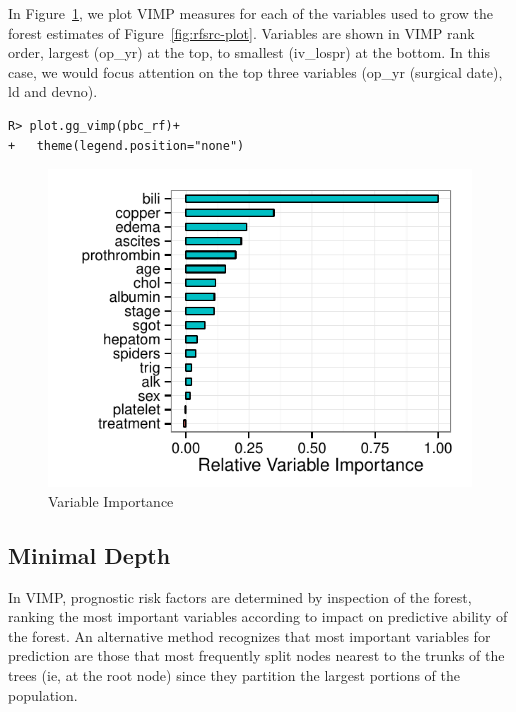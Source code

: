 \documentclass[nojss]{jss}\usepackage[]{graphicx}\usepackage[]{color}
\makeatletter
\def\maxwidth{ %
  \ifdim\Gin@nat@width>\linewidth
    \linewidth
  \else
    \Gin@nat@width
  \fi
}
\newenvironment{kframe}{%
 \def\at@end@of@kframe{}%
 \ifinner\ifhmode%
  \def\at@end@of@kframe{\end{minipage}}%
  \begin{minipage}{\columnwidth}%
 \fi\fi%
 \def\FrameCommand##1{\hskip\@totalleftmargin \hskip-\fboxsep
 \colorbox{shadecolor}{##1}\hskip-\fboxsep
     \hskip-\linewidth \hskip-\@totalleftmargin \hskip\columnwidth}%
 \MakeFramed {\advance\hsize-\width
   \@totalleftmargin\z@ \linewidth\hsize
   \@setminipage}}%
 {\par\unskip\endMakeFramed%
 \at@end@of@kframe}
\newenvironment{knitrout}{}{} %
\makeatother
\begin{document}
In Figure~\ref{fig:rf-vimp}, we plot VIMP measures for each of the variables used to grow the forest estimates of Figure~\ref{fig:rfsrc-plot}. Variables are shown in VIMP rank order, largest (op\_yr) at the top, to smallest (iv\_lospr) at the bottom. In this case, we would focus attention on the top three variables (op\_yr (surgical date), ld and devno).
\begin{knitrout}\footnotesize
{}\color{fgcolor}\begin{kframe}
\begin{verbatim}
R> plot.gg_vimp(pbc_rf)+
+   theme(legend.position="none")
\end{verbatim}
\end{kframe}\begin{figure}[!htpb]

{\centering \includegraphics[width=\maxwidth]{figure/rfs-rf-vimp-1} 

}

\caption[Variable Importance]{Variable Importance\label{fig:rf-vimp}}
\end{figure}


\end{knitrout}

\subsection{Minimal Depth}\label{S:minimalDepth}
In VIMP, prognostic risk factors are determined by inspection of the forest, ranking the most important variables according to impact on predictive ability of the forest. An alternative method recognizes that most important variables for prediction are those that most frequently split nodes nearest to the trunks of the trees (ie, at the root node) since they partition the largest portions of the population. 
\end{document}
